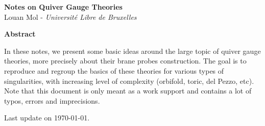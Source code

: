 \begin{titlepage}


	\begin{center}

	{\Huge{\bfseries{Notes on Quiver Gauge Theories}}}\\[0.7cm]

	Louan Mol - \textit{Université Libre de Bruxelles}

	\vspace{10cm}
	
	{\large\textbf{Abstract}}
	\end{center}
	
	    \quad In these notes, we present some basic ideas around the large topic of quiver gauge theories, more precisely about their brane probes construction.  The goal is to reproduce and regroup the basics of these theories for various types of singularities, with increasing level of complexity (orbifold, toric, del Pezzo, etc). Note that this document is only meant as a work support and contains a lot of typos, errors and imprecisions.
	    
	\vfill

	\hfill Last update on \today.
	
\end{titlepage}